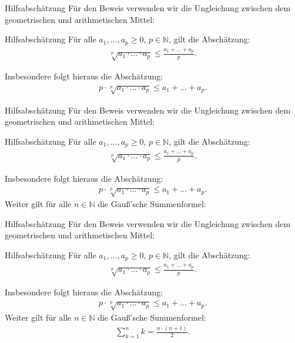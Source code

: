 \documentclass[10pt]{beamer}
\def\bN{\mathbb{N}}
\begin{document}
\begin{frame}{Hilfsabschätzung}
    Für den Beweis verwenden wir die Ungleichung zwischen dem geometrischen und arithmetischen Mittel:
    \begin{block}{Hilfsabschätzung}
        Für alle \( a_{1}, \ldots, a_{p} \geq 0 \), \( p \in \bN \), gilt die Abschätzung:
        \begin{align*}
            \sqrt[p]{a_{1} \cdot \ldots \cdot a_{p}} 
            \leq \frac{a_{1} + \ldots + a_{p}}{p}.
        \end{align*}
    \end{block}
    Insbesondere folgt hieraus die Abschätzung:
    \begin{align*}
        p \cdot \sqrt[p]{a_{1} \cdot \ldots \cdot a_{p}}
        \leq a_{1} + \ldots + a_{p}.
    \end{align*}
\end{frame}



\begin{frame}{Hilfsabschätzung}
    Für den Beweis verwenden wir die Ungleichung zwischen dem geometrischen und arithmetischen Mittel:
    \begin{block}{Hilfsabschätzung}
        Für alle \( a_{1}, \ldots, a_{p} \geq 0 \), \( p \in \bN \), gilt die Abschätzung:
        \begin{align*}
            \sqrt[p]{a_{1} \cdot \ldots \cdot a_{p}} 
            \leq \frac{a_{1} + \ldots + a_{p}}{p}.
        \end{align*}
    \end{block}
    Insbesondere folgt hieraus die Abschätzung:
    \begin{align*}
        p \cdot \sqrt[p]{a_{1} \cdot \ldots \cdot a_{p}}
        \leq a_{1} + \ldots + a_{p}.
    \end{align*}
    Weiter gilt für alle \( n \in \bN \) die Gauß'sche Summenformel:   
\end{frame}



\begin{frame}{Hilfsabschätzung}
    Für den Beweis verwenden wir die Ungleichung zwischen dem geometrischen und arithmetischen Mittel:
    \begin{block}{Hilfsabschätzung}
        Für alle \( a_{1}, \ldots, a_{p} \geq 0 \), \( p \in \bN \), gilt die Abschätzung:
        \begin{align*}
            \sqrt[p]{a_{1} \cdot \ldots \cdot a_{p}} 
            \leq \frac{a_{1} + \ldots + a_{p}}{p}.
        \end{align*}
    \end{block}
    Insbesondere folgt hieraus die Abschätzung:
    \begin{align*}
        p \cdot \sqrt[p]{a_{1} \cdot \ldots \cdot a_{p}}
        \leq a_{1} + \ldots + a_{p}.
    \end{align*}
    Weiter gilt für alle \( n \in \bN \) die Gauß'sche Summenformel:
    \begin{align*}
        \sum_{k = 1}^{n} k
        = \frac{n \cdot \left( n + 1 \right)}{2}.
    \end{align*}
\end{frame}
\end{document}
